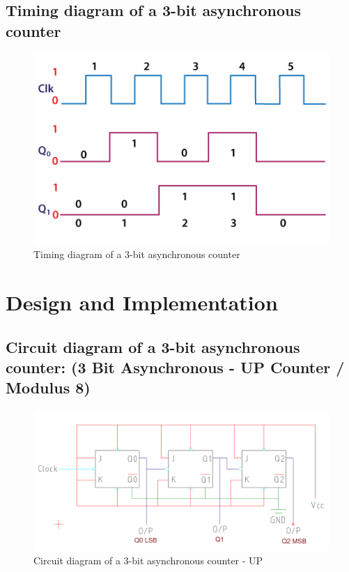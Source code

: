 \documentclass[11pt]{article}
\begin{document}
\subsection{Timing diagram of a 3-bit asynchronous counter}
\begin{figure}[H]
	\centering
	\includegraphics[scale = 0.55]{counters4.png}
	\caption{Timing diagram of a 3-bit asynchronous counter}
\end{figure}
\section{Design and Implementation}

\subsection{Circuit diagram of a 3-bit asynchronous counter: (3 Bit Asynchronous - UP Counter / Modulus 8)}
\begin{figure}[H]
	\centering
	\includegraphics[scale = 0.5]{asynchronuos counter mod 8 up.png}
	\caption{Circuit diagram of a 3-bit asynchronous counter - UP}
\end{figure}
\end{document}
